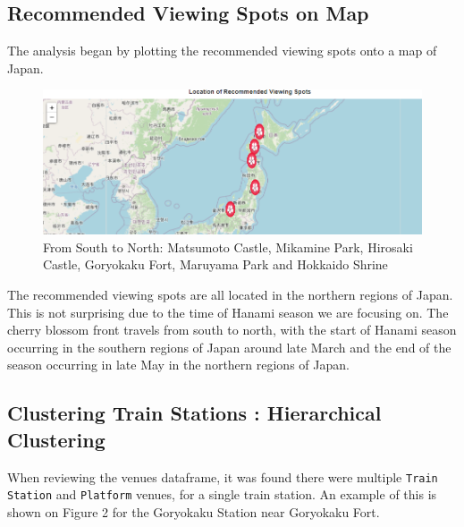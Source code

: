 \documentclass[11pt]{article}
\begin{document}
    \hypertarget{recommended-viewing-spots-on-map}{%
\subsection{Recommended Viewing Spots on Map}\label{recommended-viewing-spots-on-map}}

The analysis began by plotting the recommended viewing spots onto a map of Japan. 

\begin{figure}[H]
  \centering
\includegraphics[]{images/RecommendedViewingSpots.png}
\caption{\small{From South to North: Matsumoto Castle, Mikamine Park, Hirosaki Castle, Goryokaku Fort, Maruyama Park and Hokkaido Shrine}}
\end{figure}    

The recommended viewing spots are all located in the northern regions of Japan. This is not surprising due to the time of Hanami season 
we are focusing on. The cherry blossom front travels from south to north, with the start of Hanami season occurring in the southern regions
of Japan around late March and the end of the season occurring in late May in the northern regions of Japan.

    \hypertarget{clustering-train-stations-hierarchical-clustering}{%
\subsection{Clustering Train Stations : Hierarchical
Clustering}\label{clustering-train-stations-hierarchical-clustering}}

When reviewing the venues dataframe, it was found there were multiple \texttt{Train Station} and \texttt{Platform} venues,
for a single train station. An example of this is shown on Figure 2 for the Goryokaku Station near Goryokaku Fort. 
\end{document}
